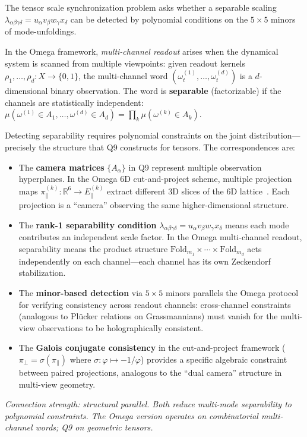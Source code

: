 \begin{remark}
The tensor scale synchronization problem asks whether a separable
scaling $\lambda_{\alpha\beta\gamma\delta}=u_\alpha v_\beta w_\gamma x_\delta$
can be detected by polynomial conditions on the $5\times 5$ minors
of mode-unfoldings.

In the Omega framework, \emph{multi-channel readout} arises when
the dynamical system is scanned from multiple viewpoints:
given readout kernels $\rho_1,\dots,\rho_d\colon X\to\{0,1\}$,
the multi-channel word
$(\omega^{(1)}_t,\dots,\omega^{(d)}_t)$ is a $d$-dimensional
binary observation.  The word is \textbf{separable} (factorizable)
if the channels are statistically independent:
$\mu(\omega^{(1)}\in A_1,\dots,\omega^{(d)}\in A_d)
=\prod_k\mu(\omega^{(k)}\in A_k)$.

Detecting separability requires polynomial constraints on the joint
distribution---precisely the structure that Q9 constructs for tensors.
The correspondences are:
\begin{itemize}[nosep]
\item The \textbf{camera matrices} $\{A_\alpha\}$ in Q9 represent
  multiple observation hyperplanes.  In the Omega 6D cut-and-project
  scheme, multiple projection maps
  $\pi_\parallel^{(k)}\colon\mathbb R^6\to E_\parallel^{(k)}$
  extract different 3D slices of the 6D lattice~\cite{omega-grg}.
  Each projection is a ``camera'' observing the same higher-dimensional
  structure.
\item The \textbf{rank-1 separability condition}
  $\lambda_{\alpha\beta\gamma\delta}=u_\alpha v_\beta w_\gamma x_\delta$
  means each mode contributes an independent scale factor.
  In the Omega multi-channel readout, separability means the
  product structure $\mathrm{Fold}_{m_1}\times\cdots\times\mathrm{Fold}_{m_d}$
  acts independently on each channel---each channel has its own
  Zeckendorf stabilization.
\item The \textbf{minor-based detection} via $5\times 5$ minors
  parallels the Omega protocol for verifying consistency across
  readout channels: cross-channel constraints (analogous to
  Pl\"ucker relations on Grassmannians) must vanish for the
  multi-view observations to be holographically consistent.
\item The \textbf{Galois conjugate consistency} in the cut-and-project
  framework ($\pi_\perp=\sigma(\pi_\parallel)$ where
  $\sigma\colon\varphi\mapsto-1/\varphi$) provides a specific
  algebraic constraint between paired projections, analogous to
  the ``dual camera'' structure in multi-view geometry.
\end{itemize}

\emph{Connection strength: structural parallel.
Both reduce multi-mode separability to polynomial constraints.
The Omega version operates on combinatorial multi-channel words;
Q9 on geometric tensors.}
\end{remark}


